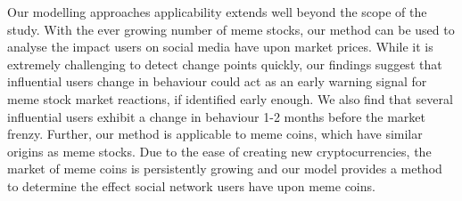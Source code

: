 Our modelling approaches applicability extends well beyond the scope of the study. With the ever growing number of meme stocks, our method can be used to analyse the impact users on social media have upon market prices. 
While it is extremely challenging to detect change points quickly, our findings suggest that influential users change in behaviour could act as an early warning signal for meme stock market reactions, if identified early enough. We also find that several influential users exhibit a change in behaviour 1-2 months before the market frenzy. %
Further, our method is applicable to meme coins, which have similar origins as meme stocks. Due to the ease of creating new cryptocurrencies, the market of meme coins is persistently growing and our model provides a method to determine the effect social network users have upon meme coins. 



